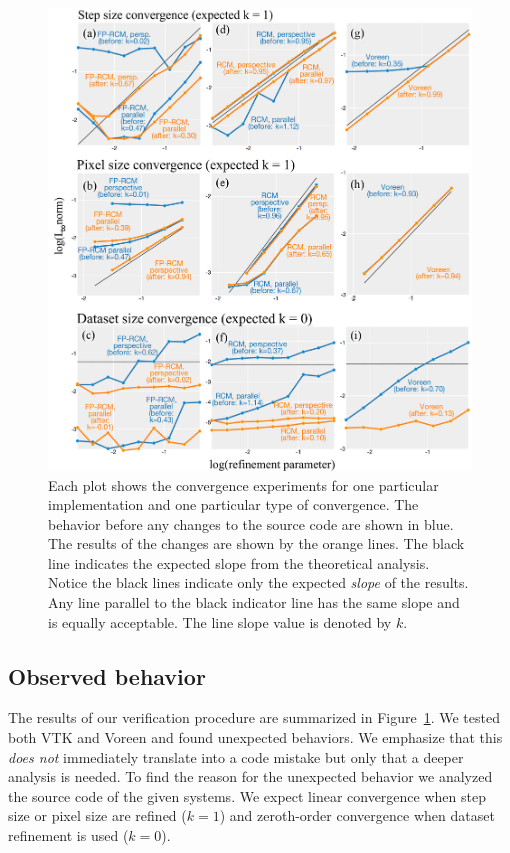 \begin{figure}[b]
\centering
\includegraphics[width=0.85\linewidth]{chapter5/figures/convergence.png}
\caption{\label{fig:convergence} Each plot shows the convergence
  experiments for one particular implementation and one particular
  type of convergence. The behavior before any changes to the source
  code are shown in blue. The results of the changes are shown by the
  orange lines. The black line indicates the expected slope from the
  theoretical analysis. Notice the black lines indicate only the
  expected \emph{slope} of the results. Any line parallel to the black
  indicator line has the same slope and is equally acceptable.  The
  line slope value is denoted by $k$.
}
\end{figure}


\subsection{Observed behavior}

The results of our verification procedure are summarized in
Figure~\ref{fig:convergence}.  We tested both VTK and Voreen and found
unexpected behaviors.  We emphasize that this \emph{does not}
immediately translate into a code mistake but only that a deeper
analysis is needed. To find the reason for the unexpected behavior we
analyzed the source code of the given systems.  We expect linear
convergence when step size or pixel size are refined ($k = 1$) and
zeroth-order convergence when dataset refinement is used ($k = 0$).

